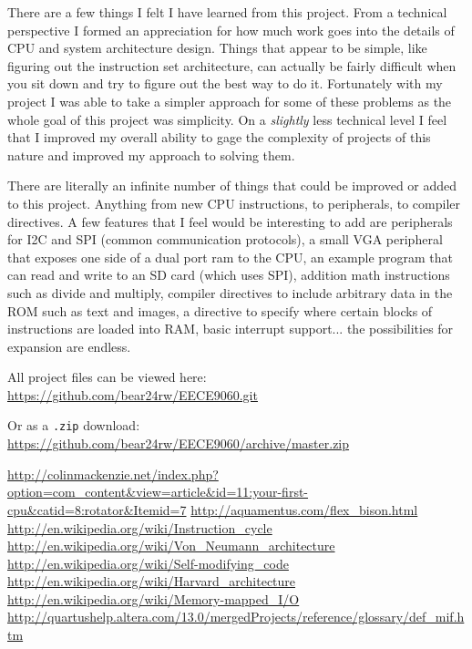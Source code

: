 \documentclass[10pt]{article}
\begin{document}
    There are a few things I felt I have learned from this project. From a
    technical perspective I formed an appreciation for how much work goes into
    the details of CPU and system architecture design. Things that appear to be
    simple, like figuring out the instruction set architecture, can actually be
    fairly difficult when you sit down and try to figure out the best way to do
    it.  Fortunately with my project I was able to take a simpler approach for
    some of these problems as the whole goal of this project was simplicity. On a
    \emph{slightly} less technical level I feel that I improved my overall
    ability to gage the complexity of projects of this nature and improved my
    approach to solving them.

    There are literally an infinite number of things that could be improved or
    added to this project. Anything from new CPU instructions, to peripherals,
    to compiler directives. A few features that I feel would be interesting to
    add are peripherals for I2C and SPI (common communication protocols), a
    small VGA peripheral that exposes one side of a dual port ram to the CPU,
    an example program that can read and write to an SD card (which uses SPI),
    addition math instructions such as divide and multiply, compiler directives
    to include arbitrary data in the ROM such as text and images, a directive
    to specify where certain blocks of instructions are loaded into RAM, basic
    interrupt support... the possibilities for expansion are endless.

\vfill
All project files can be viewed here:\\
\url{https://github.com/bear24rw/EECE9060.git}

Or as a \texttt{.zip} download:\\
\url{https://github.com/bear24rw/EECE9060/archive/master.zip}


\newpage
\begin{thebibliography}{9}

     \url{http://colinmackenzie.net/index.php?option=com_content&view=article&id=11:your-first-cpu&catid=8:rotator&Itemid=7}
     \url{http://aquamentus.com/flex_bison.html}
     \url{http://en.wikipedia.org/wiki/Instruction_cycle}
     \url{http://en.wikipedia.org/wiki/Von_Neumann_architecture}
     \url{http://en.wikipedia.org/wiki/Self-modifying_code}
     \url{http://en.wikipedia.org/wiki/Harvard_architecture}
     \url{http://en.wikipedia.org/wiki/Memory-mapped_I/O}
     \url{http://quartushelp.altera.com/13.0/mergedProjects/reference/glossary/def_mif.htm}
\end{thebibliography}
\end{document}
